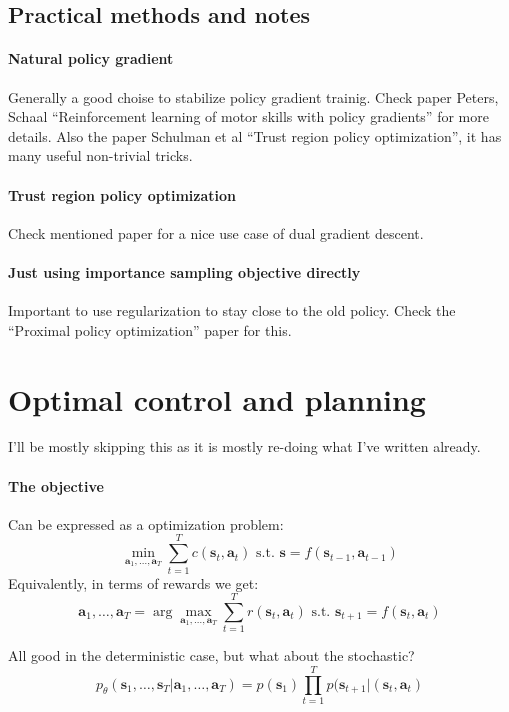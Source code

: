 \documentclass{report}
\newcommand{\argmax}{\arg\!\max}
\begin{document}
\subsection{Practical methods and notes}
\paragraph{Natural policy gradient}
Generally a good choise to stabilize policy gradient trainig.
Check paper Peters, Schaal ``Reinforcement learning of motor skills with policy gradients'' for more details.
Also the paper Schulman et al ``Trust region policy optimization'',
it has many useful non-trivial tricks.
\paragraph{Trust region policy optimization}
Check mentioned paper for a nice use case of dual gradient descent.
\paragraph{Just using importance sampling objective directly}
Important to use regularization to stay close to the old policy.
Check the ``Proximal policy optimization'' paper for this.




\section{Optimal control and planning}
I'll be mostly skipping this as it is mostly re-doing what I've written already.

\paragraph{The objective}
Can be expressed as a optimization problem:
\begin{equation}
		\min_{\bm{a}_1, \dots, \bm{a}_T} \sum_{t=1}^{T} c(\bm{s}_{t}, \bm{a}_{t}) \text{ s.t. } \bm{s} = f (\bm{s}_{t-1}, \bm{a}_{t-1} ) 
\end{equation}
Equivalently, in terms of rewards we get:
\begin{equation}
		\bm{a}_1, \dots, \bm{a}_T = \argmax_{\bm{a}_1, \dots, \bm{a}_T} \sum_{t=1}^{T} r (\bm{s}_{t}, \bm{a}_{t} ) 
		\text{ s.t. } \bm{s}_{t+1} = f (\bm{s}_{t}, \bm{a}_{t} )
\end{equation}

All good in the deterministic case, but what about the stochastic?
\begin{equation}
p_\theta \left( \bm{s}_1, \dots, \bm{s}_T |  \bm{a}_1, \dots, \bm{a}_T \right) 
= p(\bm{s}_1) \prod_{t=1}^{T} p(\bm{s}_{t+1}| (\bm{s}_{t}, \bm{a}_{t} ) 
\end{equation}
\end{document}
